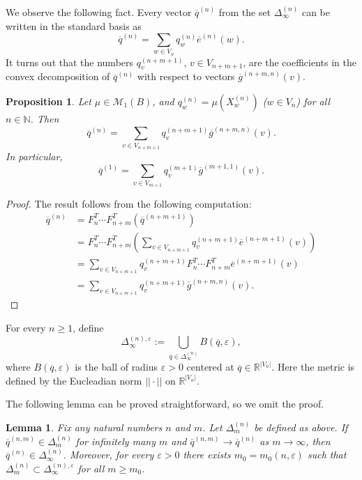 \documentclass[11pt, english, reqno]{amsart}
\theoremstyle{definition}
\theoremstyle{remark}
\theoremstyle{plain}
\newtheorem{prop}[defin]{Proposition}
\newtheorem{lemma}[defin]{Lemma}
\def\ov{\overline}
\numberwithin{equation}{section}
\begin{document}
We observe the following fact. Every vector $\ov q^{(n)} $ from
 the set $\Delta_{\infty}^{(n)}$ can be  written in the standard basis as
$$
\ov q^{(n)} = \sum_{w\in V_n}q^{(n)}_w \ov e^{(n)}(w).
$$
 It turns out that the numbers $q_v^{(n+m+1)}$, $v \in V_{n+m+1}$,
  are the coefficients in the convex decomposition of $\ov q^{(n)}$
  with respect to vectors $\ov g^{(n+m,n)}(v)$.

\begin{prop}\label{decomposition_q_n_by_q_n+m}
Let $\mu \in \mathcal{M}_1(B)$, and $q^{(n)}_w = \mu(X^{(n)}_w)$
($w \in V_n$) for all $n \in \mathbb{N}$. Then
\begin{equation}\label{2.3ab}
\ov q^{(n)} = \sum_{v \in V_{n+m+1}} q_v^{(n+m+1)} \ov
g^{(n+m,n)}(v).
\end{equation}
In particular,
$$
\ov q^{(1)} = \sum_{v \in V_{m+1}} q_v^{(m+1)} \ov g^{(m+1,1)}(v).
$$
\end{prop}

\begin{proof}
The result follows from the following computation:
\begin{align*}
\ov q^{(n)} &= F_n^{T} \cdots F^T_{n+m} (\ov q^{(n+m+1)})\nonumber\\
 &= F_n^{T} \cdots F^T_{n+m} \left(\sum_{v \in V_{n+m+1}}
 q_v^{(n+m+1)} \ov e^{(n+m+1)}(v)\right)\nonumber\\
 &= \sum_{v \in V_{n+m+1}} q_v^{(n+m+1)} F_n^{T} \cdots F^T_{n+m}
 \ov e^{(n+m+1)}(v)\nonumber\\
 &= \sum_{v \in V_{n+m+1}} q_v^{(n+m+1)} \ov g^{(n+m,n)}(v).
\end{align*}
\end{proof}

For every $n \geq 1$,  define
$$
\Delta^{(n), \varepsilon}_{\infty} := \bigcup_{\ov q \in
 \Delta_{\infty}^{(n)}} B(\ov q, \varepsilon),
$$
where $B(\ov q, \varepsilon)$ is the ball of radius $\varepsilon > 0$
centered at  $\ov q \in \mathbb{R}^{|V_n|}$. Here the metric is
defined by the Eucleadian norm $||\cdot ||$ on $\mathbb R^{|V_n|}$.

The following lemma can be proved straightforward, so we omit the proof.

\begin{lemma}\label{remar1}
Fix any natural numbers  $n$ and $m$.   Let $\Delta_{m}^{(n)}$ be defined
as above.
If $\ov q^{(n,m)} \in \Delta_{m}^{(n)}$ for infinitely many $m$
and $\ov q^{(n,m)} \rightarrow \ov q^{(n)}$ as $m \to \infty$,   then
$\ov q^{(n)} \in
\Delta_{\infty}^{(n)}$. Moreover, for every $\varepsilon > 0$ there exists $m_0 = m_0(n,\varepsilon)$
 such that $\Delta_{m}^{(n)} \subset \Delta^{(n),
 \varepsilon}_{\infty}$ for all $m \geq m_0$.
\end{lemma}
\end{document}
